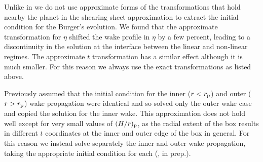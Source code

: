 Unlike in \citet{goodman2001,rafikov2002a,bollati2021} we do not use approximate forms of the transformations that hold nearby the planet in the shearing sheet approximation to extract the initial condition for the Burger's evolution.
We found that the approximate transformation for $\eta$ \citep[equations 35 in][]{rafikov2002a} shifted the wake profile in $\eta$ by a few percent, leading to a discontinuity in the solution at the interface between the linear and non-linear regimes.
The approximate $t$ transformation has a similar effect although it is much smaller.
For this reason we always use the exact transformations as listed above.

Previously \citet{bollati2021} assumed that the initial condition for the inner ($r<r_{\rm p}$) and outer ($r>r_{\rm p}$) wake propagation were identical and so solved only the outer wake case and copied the solution for the inner wake.
This approximation does not hold well except for very small values of $(H/r)_{\rm p}$, as the radial extent of the box results in different $t$ coordinates at the inner and outer edge of the box in general.
For this reason we instead solve separately the inner and outer wake propagation, taking the appropriate initial condition for each (\citeauthor{fasanoinprep.}, in prep.).

